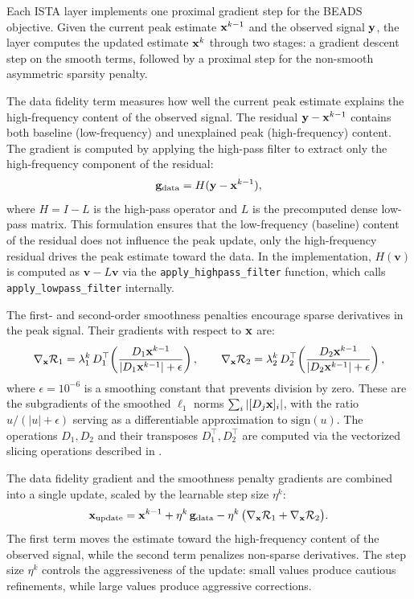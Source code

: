 Each ISTA layer implements one proximal gradient step for the BEADS objective. Given the current peak estimate $\mathbf{x}^{k-1}$ and the observed signal $\mathbf{y}$, the layer computes the updated estimate $\mathbf{x}^k$ through two stages: a gradient descent step on the smooth terms, followed by a proximal step for the non-smooth asymmetric sparsity penalty.

The data fidelity term measures how well the current peak estimate explains the high-frequency content of the observed signal. The residual $\mathbf{y} - \mathbf{x}^{k-1}$ contains both baseline (low-frequency) and unexplained peak (high-frequency) content. The gradient is computed by applying the high-pass filter to extract only the high-frequency component of the residual:
\begin{equation}
    \mathbf{g}_{\text{data}} = H(\mathbf{y} - \mathbf{x}^{k-1}),
    \label{eq:data_grad}
\end{equation}
where $H = I - L$ is the high-pass operator and $L$ is the precomputed dense low-pass matrix. This formulation ensures that the low-frequency (baseline) content of the residual does not influence the peak update, only the high-frequency residual drives the peak estimate toward the data. In the implementation, $H(\mathbf{v})$ is computed as $\mathbf{v} - L\mathbf{v}$ via the \texttt{apply\_highpass\_filter} function, which calls \texttt{apply\_lowpass\_filter} internally.

The first- and second-order smoothness penalties encourage sparse derivatives in the peak signal. Their gradients with respect to $\mathbf{x}$ are:
\begin{equation}
    \nabla_{\mathbf{x}} \mathcal{R}_1 = \lambda_1^k\, D_1^\top\! \left(\frac{D_1 \mathbf{x}^{k-1}}{|D_1 \mathbf{x}^{k-1}| + \epsilon}\right), \qquad
    \nabla_{\mathbf{x}} \mathcal{R}_2 = \lambda_2^k\, D_2^\top\! \left(\frac{D_2 \mathbf{x}^{k-1}}{|D_2 \mathbf{x}^{k-1}| + \epsilon}\right),
    \label{eq:smoothness_grads}
\end{equation}
where $\epsilon = 10^{-6}$ is a smoothing constant that prevents division by zero. These are the subgradients of the smoothed $\ell_1$ norms $\sum_i |[D_j \mathbf{x}]_i|$, with the ratio $u / (|u| + \epsilon)$ serving as a differentiable approximation to $\text{sign}(u)$. The operations $D_1, D_2$ and their transposes $D_1^\top, D_2^\top$ are computed via the vectorized slicing operations described in .

The data fidelity gradient and the smoothness penalty gradients are combined into a single update, scaled by the learnable step size $\eta^k$:
\begin{equation}
    \mathbf{x}_{\text{update}} = \mathbf{x}^{k-1} + \eta^k\, \mathbf{g}_{\text{data}} - \eta^k\, \big(\nabla_{\mathbf{x}} \mathcal{R}_1 + \nabla_{\mathbf{x}} \mathcal{R}_2\big).
    \label{eq:grad_step}
\end{equation}
The first term moves the estimate toward the high-frequency content of the observed signal, while the second term penalizes non-sparse derivatives. The step size $\eta^k$ controls the aggressiveness of the update: small values produce cautious refinements, while large values produce aggressive corrections.

